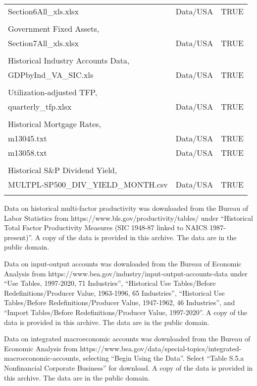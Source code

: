 \documentclass[
]{article}
\begin{document}
\begin{longtable}{p{4.5in}p{1in}p{1in}}
Section6All\_xls.xlsx  & Data/USA & TRUE \\
\\
\multicolumn{3}{l}{Government Fixed Assets, \cite{beagov}} \\ \midrule
Section7All\_xls.xlsx  & Data/USA & TRUE \\
\\
\multicolumn{3}{l}{Historical Industry Accounts Data, \cite{beahistind}} \\ \midrule
GDPbyInd\_VA\_SIC.xls & Data/USA & TRUE \\
\\
\multicolumn{3}{l}{Utilization-adjusted TFP, \cite{fernalddata}} \\ \midrule
quarterly\_tfp.xlsx & Data/USA & TRUE \\
\\
\multicolumn{3}{l}{Historical Mortgage Rates, \cite{nberhistory}} \\ \midrule
m13045.txt & Data/USA & TRUE \\
m13058.txt & Data/USA & TRUE \\
\\
\multicolumn{3}{l}{Historical S\&P Dividend Yield, \cite{shiller}} \\ \midrule
MULTPL-SP500\_DIV\_YIELD\_MONTH.csv & Data/USA & TRUE \\
\\
\end{longtable}

Data on historical multi-factor productivity was downloaded from the Bureau of Labor Statistics \citep{blsdata} from https://www.bls.gov/productivity/tables/ under ``Historical Total Factor Productivity Measures (SIC 1948-87 linked to NAICS 1987-present)''. A copy of the data is provided in this archive. The data are in the public domain.

Data on input-output accounts was downloaded from the Bureau of Economic Analysis \citep{beaio} from https://www.bea.gov/industry/input-output-accounts-data under ``Use Tables, 1997-2020, 71 Industries'', ``Historical Use Tables/Before Redefinitions/Producer Value, 1963-1996, 65 Industries'', ``Historical Use Tables/Before Redefinitions/Producer Value, 1947-1962, 46 Industries'', and ``Import Tables/Before Redefinitions/Producer Value, 1997-2020''. A copy of the data is provided in this archive. The data are in the public domain.

Data on integrated macroeconomic accounts was downloaded from the Bureau of Economic Analysis \citep{beaimap} from https://www.bea.gov/data/special-topics/integrated-macroeconomic-accounts, selecting ``Begin Using the Data''. Select ``Table S.5.a Nonfinancial Corporate Business'' for download. A copy of the data is provided in this archive. The data are in the public domain.
\end{document}
